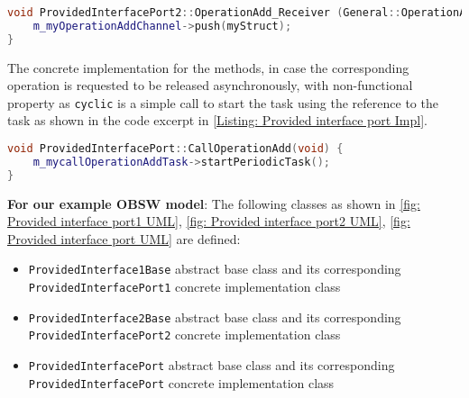 \begin{Listing}
\begin{lstlisting}[language=C++]
void ProvidedInterfacePort2::OperationAdd_Receiver (General::OperationAddStruct_InterfaceB myStruct) {
	m_myOperationAddChannel->push(myStruct);
}
\end{lstlisting}
\caption{Code excerpt from the generated code for operation \texttt{OperationAdd} access in \texttt{Provided\allowbreak Interface\allowbreak Port2} which is called asynchronously}
\label{Listing: Provided interface port2 Impl}
\end{Listing}

The concrete implementation for the methods, in case the corresponding operation is requested to be released asynchronously, with non-functional property as \texttt{cyclic} is a simple call to start the task using the reference to the task as shown in the code excerpt in \cref{Listing: Provided interface port Impl}.

\begin{Listing}
\begin{lstlisting}[language=C++]
void ProvidedInterfacePort::CallOperationAdd(void) {
	m_mycallOperationAddTask->startPeriodicTask();
}
\end{lstlisting}
\caption{Code excerpt from the generated code for operation \texttt{CallOperationAdd} in \texttt{Provided\allowbreak Interface\allowbreak Port} which has non-functional property set as \texttt{Cyclic}}
\label{Listing: Provided interface port Impl}
\end{Listing}

\textbf{For our example OBSW model}: The following classes as shown in \cref{fig: Provided interface port1 UML}, \cref{fig: Provided interface port2 UML}, \cref{fig: Provided interface port UML} are defined:
\begin{itemize}
\item \texttt{Provided\allowbreak Interface1\allowbreak Base} abstract base class and its corresponding \texttt{Provided\allowbreak Interface\allowbreak Port1} concrete implementation class
\item \texttt{Provided\allowbreak Interface2\allowbreak Base} abstract base class and its corresponding \texttt{Provided\allowbreak Interface\allowbreak Port2} concrete implementation class
\item \texttt{Provided\allowbreak Interface\allowbreak Port} abstract base class and its corresponding \texttt{Provided\allowbreak Interface\allowbreak Port} concrete implementation class 
\end{itemize} 

